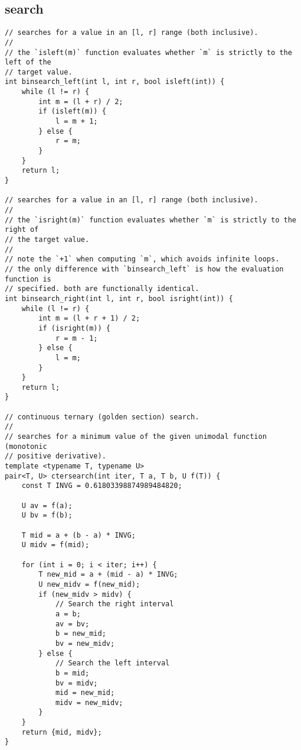 \documentclass[twoside]{article}
\begin{document}
\begin{multicols*}{2}
{
\section*{search}
}
\begin{verbatim}
// searches for a value in an [l, r] range (both inclusive).
//
// the `isleft(m)` function evaluates whether `m` is strictly to the left of the
// target value.
int binsearch_left(int l, int r, bool isleft(int)) {
    while (l != r) {
        int m = (l + r) / 2;
        if (isleft(m)) {
            l = m + 1;
        } else {
            r = m;
        }
    }
    return l;
}

// searches for a value in an [l, r] range (both inclusive).
//
// the `isright(m)` function evaluates whether `m` is strictly to the right of
// the target value.
//
// note the `+1` when computing `m`, which avoids infinite loops.
// the only difference with `binsearch_left` is how the evaluation function is
// specified. both are functionally identical.
int binsearch_right(int l, int r, bool isright(int)) {
    while (l != r) {
        int m = (l + r + 1) / 2;
        if (isright(m)) {
            r = m - 1;
        } else {
            l = m;
        }
    }
    return l;
}

// continuous ternary (golden section) search.
//
// searches for a minimum value of the given unimodal function (monotonic
// positive derivative).
template <typename T, typename U>
pair<T, U> ctersearch(int iter, T a, T b, U f(T)) {
    const T INVG = 0.61803398874989484820;

    U av = f(a);
    U bv = f(b);

    T mid = a + (b - a) * INVG;
    U midv = f(mid);

    for (int i = 0; i < iter; i++) {
        T new_mid = a + (mid - a) * INVG;
        U new_midv = f(new_mid);
        if (new_midv > midv) {
            // Search the right interval
            a = b;
            av = bv;
            b = new_mid;
            bv = new_midv;
        } else {
            // Search the left interval
            b = mid;
            bv = midv;
            mid = new_mid;
            midv = new_midv;
        }
    }
    return {mid, midv};
}
\end{verbatim}

\end{multicols*}
\end{document}
